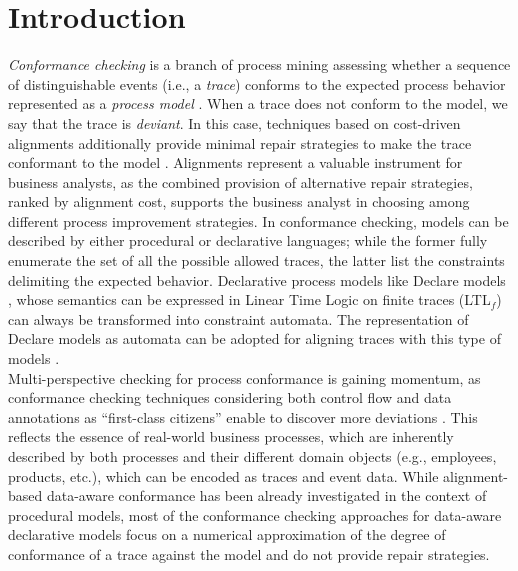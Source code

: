 \section{Introduction}
\label{sec:introduction}

\textit{Conformance checking} is a branch of process mining assessing whether a sequence of distinguishable events (i.e., a \textit{trace}) conforms to the expected process behavior represented as a \textit{process model} \cite{RozinatA08}. When a trace does not conform to the model, we say that the trace is \textit{deviant}. In this case, techniques based on cost-driven alignments additionally provide minimal repair strategies to make the trace conformant to the model \cite{DBLP:conf/edoc/AdriansyahDA11}. Alignments represent a valuable instrument for business analysts, as the combined provision of alternative repair strategies, ranked by alignment cost, supports the business analyst in choosing among different process improvement strategies. In conformance checking, models can be described by either procedural or declarative languages;  while the former fully enumerate the set of all the possible allowed traces, the latter %
list the constraints delimiting the expected behavior. %
{Declarative process models like Declare models \cite{DBLP:conf/edoc/PesicSA07}, whose semantics can be expressed in {Linear Time Logic on finite traces (LTL$_f$)} \cite{GiacomoV13} can always be transformed into constraint automata.}
%
The representation of Declare models as automata can be adopted for aligning traces with this type of models \cite{LeoniMA12,XuLZ17a}.
\\
\indent
Multi-perspective checking for process conformance is gaining momentum, as conformance checking techniques considering both control flow and data annotations as ``first-class citizens'' enable to discover more deviations \cite{MultiPerspective}. This reflects the essence of real-world business processes, which are inherently described by both processes and their different domain objects \cite{PetermannJMR14} (e.g., employees, products, etc.), which can be encoded as traces and event data. While alignment-based  data-aware conformance has been already investigated in the context of procedural models, most of the conformance checking approaches for data-aware declarative models \cite{BurattinMS16} focus on a numerical approximation of the degree of conformance of a trace against the model and do not provide repair strategies.
